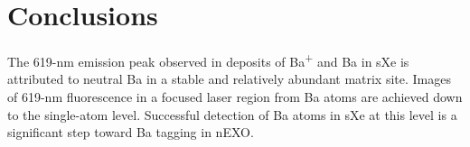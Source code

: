 \documentclass[aps,pra,reprint,superscriptaddress]{revtex4-1}
\begin{document}



\section{Conclusions}

The 619-nm emission peak observed in deposits of Ba\textsuperscript{+} and Ba in sXe is attributed to neutral Ba in a stable and relatively abundant matrix site.
Images of 619-nm fluorescence in a focused laser region from Ba atoms are achieved down to the single-atom level.  Successful detection of Ba atoms in sXe at this level is a significant step toward Ba tagging in nEXO. 
\end{document}
